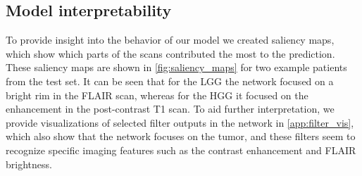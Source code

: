 \subsection{Model interpretability}
To provide insight into the behavior of our model we created saliency maps, which show which parts of the scans contributed the most to the prediction.
These saliency maps are shown in \cref{fig:saliency_maps} for two example patients from the test set.
It can be seen that for the \gls{LGG} the network focused on a bright rim in the \gls{FLAIR} scan, whereas for the \gls{HGG} it focused on the enhancement in the post-contrast \gls{T1} scan.
To aid further interpretation, we provide visualizations of selected filter outputs in the network in \cref{app:filter_vis}, which also show that the network focuses on the tumor, and these filters seem to recognize specific imaging features such as the contrast enhancement and \gls{FLAIR} brightness.

